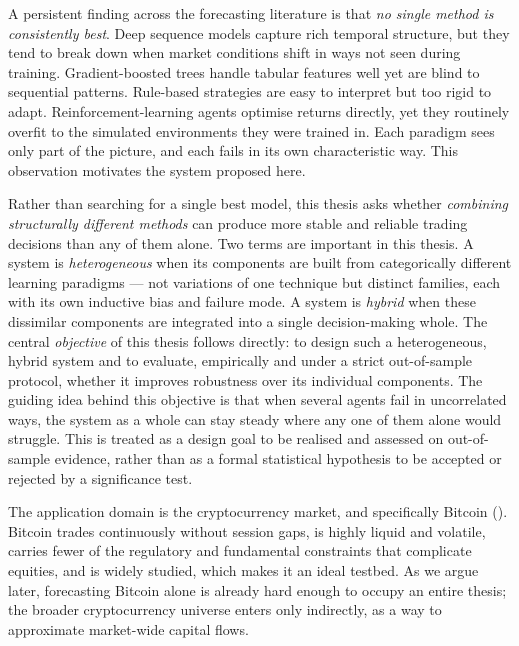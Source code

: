 A persistent finding across the forecasting literature is that \textit{no single method is consistently best}. Deep sequence models capture rich temporal structure, but they tend to break down when market conditions shift in ways not seen during training. Gradient-boosted trees handle tabular features well yet are blind to sequential patterns. Rule-based strategies are easy to interpret but too rigid to adapt. Reinforcement-learning agents optimise returns directly, yet they routinely overfit to the simulated environments they were trained in. Each paradigm sees only part of the picture, and each fails in its own characteristic way. This observation motivates the system proposed here.


Rather than searching for a single best model, this thesis asks whether \textit{combining structurally different methods} can produce more stable and reliable trading decisions than any of them alone. Two terms are important in this thesis. A system is \textit{heterogeneous} when its components are built from categorically different learning paradigms --- not variations of one technique but distinct families, each with its own inductive bias and failure mode. A system is \textit{hybrid} when these dissimilar components are integrated into a single decision-making whole. The central \textit{objective} of this thesis follows directly: to design such a heterogeneous, hybrid system and to evaluate, empirically and under a strict out-of-sample protocol, whether it improves robustness over its individual components. The guiding idea behind this objective is that when several agents fail in uncorrelated ways, the system as a whole can stay steady where any one of them alone would struggle. This is treated as a design goal to be realised and assessed on out-of-sample evidence, rather than as a formal statistical hypothesis to be accepted or rejected by a significance test.


The application domain is the cryptocurrency market, and specifically Bitcoin (). Bitcoin trades continuously without session gaps, is highly liquid and volatile, carries fewer of the regulatory and fundamental constraints that complicate equities, and is widely studied, which makes it an ideal testbed. As we argue later, forecasting Bitcoin alone is already hard enough to occupy an entire thesis; the broader cryptocurrency universe enters only indirectly, as a way to approximate market-wide capital flows.


